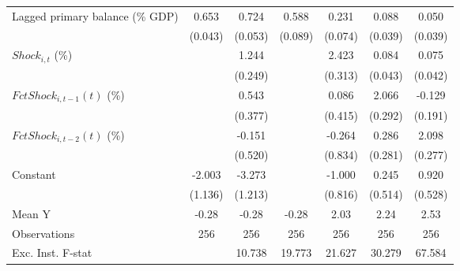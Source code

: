 {\begin{tabular}{l*{6}{c}}
\addlinespace
Lagged primary balance (\% GDP)&       0.653\sym{***}&       0.724\sym{***}&       0.588\sym{***}&       0.231\sym{***}&       0.088\sym{**} &       0.050         \\
                    &     (0.043)         &     (0.053)         &     (0.089)         &     (0.074)         &     (0.039)         &     (0.039)         \\
\addlinespace
$ Shock_{i,t}$ (\%) &                     &       1.244\sym{***}&                     &       2.423\sym{***}&       0.084\sym{*}  &       0.075\sym{*}  \\
                    &                     &     (0.249)         &                     &     (0.313)         &     (0.043)         &     (0.042)         \\
\addlinespace
$ FctShock_{i,t-1}(t)$ (\%)&                     &       0.543         &                     &       0.086         &       2.066\sym{***}&      -0.129         \\
                    &                     &     (0.377)         &                     &     (0.415)         &     (0.292)         &     (0.191)         \\
\addlinespace
$ FctShock_{i,t-2}(t)$ (\%)&                     &      -0.151         &                     &      -0.264         &       0.286         &       2.098\sym{***}\\
                    &                     &     (0.520)         &                     &     (0.834)         &     (0.281)         &     (0.277)         \\
\addlinespace
Constant            &      -2.003         &      -3.273\sym{**} &                     &      -1.000         &       0.245         &       0.920         \\
                    &     (1.136)         &     (1.213)         &                     &     (0.816)         &     (0.514)         &     (0.528)         \\
\midrule
Mean Y              &       -0.28         &       -0.28         &       -0.28         &        2.03         &        2.24         &        2.53         \\
Observations        &         256         &         256         &         256         &         256         &         256         &         256         \\
Exc. Inst. F-stat   &                     &      10.738         &      19.773         &      21.627         &      30.279         &      67.584         \\
\bottomrule
\end{tabular}
}
